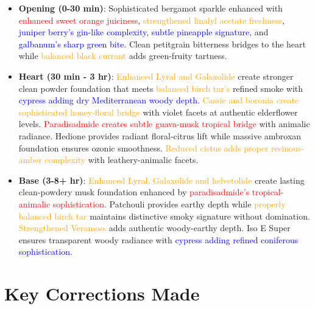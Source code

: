 \documentclass{article}
\begin{document}
\begin{itemize}
    \item \textbf{Opening (0-30 min)}: Sophisticated bergamot sparkle enhanced with \textcolor{red}{enhanced sweet orange juiciness}, \textcolor{orange}{strengthened linalyl acetate freshness}, \textcolor{blue}{juniper berry's gin-like complexity}, \textcolor{blue}{subtle pineapple signature}, and \textcolor{blue}{galbanum's sharp green bite}. Clean petitgrain bitterness bridges to the heart while \textcolor{orange}{balanced black currant} adds green-fruity tartness.
    
    \item \textbf{Heart (30 min - 3 hr)}: \textcolor{orange}{Enhanced Lyral and Galaxolide} create stronger clean powder foundation that meets \textcolor{orange}{balanced birch tar's} refined smoke with \textcolor{blue}{cypress adding dry Mediterranean woody depth}. \textcolor{orange}{Cassie and boronia create sophisticated honey-floral bridge} with violet facets at authentic elderflower levels. \textcolor{red}{Paradisadmide creates subtle guava-musk tropical bridge} with animalic radiance. Hedione provides radiant floral-citrus lift while massive ambroxan foundation ensures ozonic smoothness. \textcolor{orange}{Reduced cistus adds proper resinous-amber complexity} with leathery-animalic facets.
    
    \item \textbf{Base (3-8+ hr)}: \textcolor{orange}{Enhanced Lyral, Galaxolide and helvetolide} create lasting clean-powdery musk foundation enhanced by \textcolor{red}{paradisadmide's tropical-animalic sophistication}. Patchouli provides earthy depth while \textcolor{orange}{properly balanced birch tar} maintains distinctive smoky signature without domination. \textcolor{orange}{Strengthened Veramoss} adds authentic woody-earthy depth. Iso E Super ensures transparent woody radiance with \textcolor{blue}{cypress adding refined coniferous sophistication}.
\end{itemize}

\section{Key Corrections Made}
\end{document}
